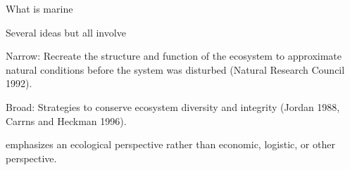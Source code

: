 \documentclass[t]{beamer}
\begin{document}

\begin{frame}[t]{What is marine }
\end{frame}
%


\begin{frame}[t]{Several ideas but all involve }

	\hangpara Narrow: Recreate the structure and function of the ecosystem to approximate natural conditions before the system was disturbed (Natural Research Council 1992).
	
	\pause
	
	\hangpara Broad: Strategies to conserve ecosystem diversity and integrity (Jordan 1988, Carrns and Heckman 1996).

	\pause
	
	\hangpara {} emphasizes an ecological perspective rather than economic, logistic, or other perspective.
\end{frame}

%
\end{document}
